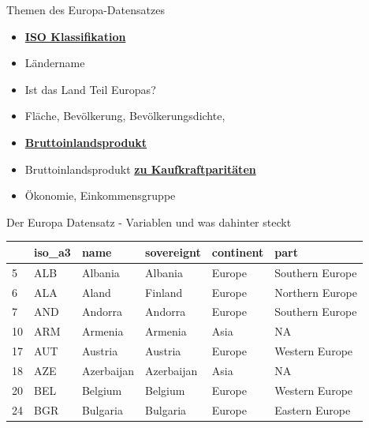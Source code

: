 \documentclass[ignorenonframetext,]{beamer}
\providecommand{\tightlist}{%
  \setlength{\itemsep}{0pt}\setlength{\parskip}{0pt}}
\begin{document}
\begin{frame}{Themen des Europa-Datensatzes}

\begin{itemize}
\tightlist
\item
  \href{http://userpage.chemie.fu-berlin.de/diverse/doc/ISO_3166.html}{\textbf{ISO
  Klassifikation}}
\item
  Ländername
\item
  Ist das Land Teil Europas?
\item
  Fläche, Bevölkerung, Bevölkerungsdichte,
\item
  \href{https://en.wikipedia.org/wiki/Gross_domestic_product}{\textbf{Bruttoinlandsprodukt}}
\item
  Bruttoinlandsprodukt
  \href{https://en.wikipedia.org/wiki/List_of_countries_by_GDP_\%28PPP\%29_per_capita}{\textbf{zu
  Kaufkraftparitäten}}
\item
  Ökonomie, Einkommensgruppe
\end{itemize}

\end{frame}

\begin{frame}{Der Europa Datensatz - Variablen und was dahinter steckt}

\begin{longtable}[]{@{}llllll@{}}
\toprule
& iso\_a3 & name & sovereignt & continent & part\tabularnewline
\midrule
\endhead
5 & ALB & Albania & Albania & Europe & Southern Europe\tabularnewline
6 & ALA & Aland & Finland & Europe & Northern Europe\tabularnewline
7 & AND & Andorra & Andorra & Europe & Southern Europe\tabularnewline
10 & ARM & Armenia & Armenia & Asia & NA\tabularnewline
17 & AUT & Austria & Austria & Europe & Western Europe\tabularnewline
18 & AZE & Azerbaijan & Azerbaijan & Asia & NA\tabularnewline
20 & BEL & Belgium & Belgium & Europe & Western Europe\tabularnewline
24 & BGR & Bulgaria & Bulgaria & Europe & Eastern Europe\tabularnewline
\bottomrule
\end{longtable}

\end{frame}
\end{document}
